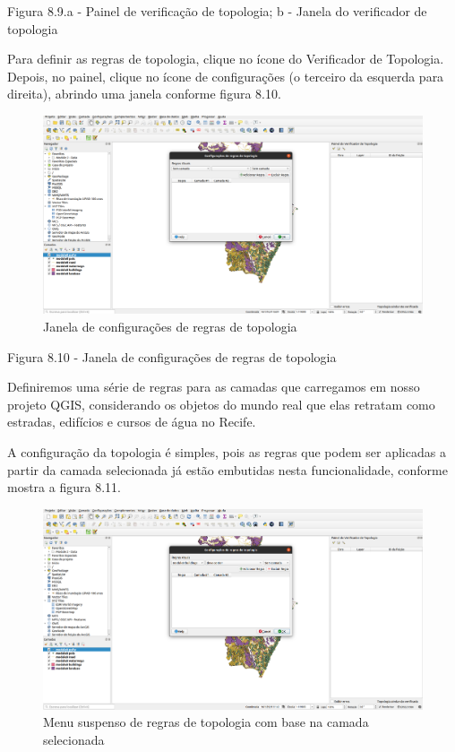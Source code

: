 \documentclass[
  portuguese,
]{krantz}
\begin{document}
Figura 8.9.a - Painel de verificação de topologia; b - Janela do verificador de topologia

Para definir as regras de topologia, clique no ícone do Verificador de Topologia. Depois, no painel, clique no ícone de configurações (o terceiro da esquerda para direita), abrindo uma janela conforme figura 8.10.

\begin{figure}
\centering
\includegraphics{media/modulo8/fig810.png}
\caption{Janela de configurações de regras de topologia}
\end{figure}

Figura 8.10 - Janela de configurações de regras de topologia

Definiremos uma série de regras para as camadas que carregamos em nosso projeto QGIS, considerando os objetos do mundo real que elas retratam como estradas, edifícios e cursos de água no Recife.

A configuração da topologia é simples, pois as regras que podem ser aplicadas a partir da camada selecionada já estão embutidas nesta funcionalidade, conforme mostra a figura 8.11.

\begin{figure}
\centering
\includegraphics{media/modulo8/fig811.png}
\caption{Menu suspenso de regras de topologia com base na camada selecionada}
\end{figure}
\end{document}
